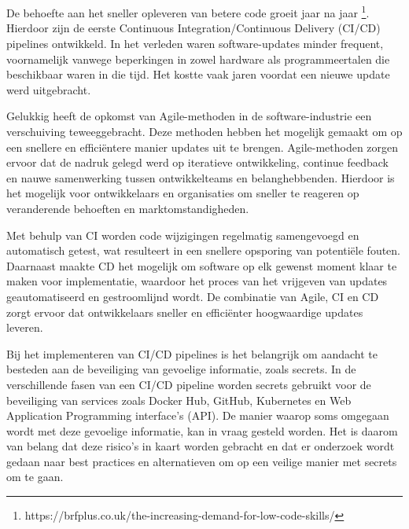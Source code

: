
\chapter{}%
\label{ch:inleiding}

De behoefte aan het sneller opleveren van betere code groeit jaar na jaar \footnote{https://brfplus.co.uk/the-increasing-demand-for-low-code-skills/}. Hierdoor zijn de eerste Continuous Integration/Continuous Delivery (CI/CD) pipelines ontwikkeld. In het verleden waren \mbox{software-updates} minder frequent, voornamelijk vanwege beperkingen in zowel hardware als programmeertalen die beschikbaar waren in die tijd. \autocite{Jiang2009} Het kostte vaak jaren voordat een nieuwe update werd uitgebracht.
\newline

Gelukkig heeft de opkomst van Agile-methoden in de software-industrie een verschuiving teweeggebracht. Deze methoden hebben het mogelijk gemaakt om op een snellere en efficiëntere manier updates uit te brengen. Agile-methoden zorgen ervoor dat de nadruk gelegd werd op iteratieve ontwikkeling, continue feedback en nauwe samenwerking tussen ontwikkelteams en belanghebbenden. Hierdoor is het mogelijk voor ontwikkelaars en organisaties om sneller te reageren op veranderende behoeften en marktomstandigheden.
\newline

Met behulp van CI worden code wijzigingen regelmatig samengevoegd en automatisch getest, wat resulteert in een snellere opsporing van potentiële fouten. Daarnaast maakte CD het mogelijk om software op elk gewenst moment klaar te maken voor implementatie, waardoor het proces van het vrijgeven van updates geautomatiseerd en gestroomlijnd wordt. De combinatie van Agile, CI en CD zorgt ervoor dat ontwikkelaars sneller en efficiënter hoogwaardige updates leveren.
\clearpage

Bij het implementeren van CI/CD pipelines is het belangrijk om aandacht te besteden aan de beveiliging van gevoelige informatie, zoals secrets. In de verschillende fasen van een CI/CD pipeline worden secrets gebruikt voor de beveiliging van services zoals Docker Hub, GitHub, Kubernetes en Web Application Programming interface's (API). De manier waarop soms omgegaan wordt met deze gevoelige informatie, kan in vraag gesteld worden. Het is daarom van belang dat deze risico's in kaart worden gebracht en dat er onderzoek wordt gedaan naar best practices en alternatieven om op een veilige manier met secrets om te gaan.
\newline

